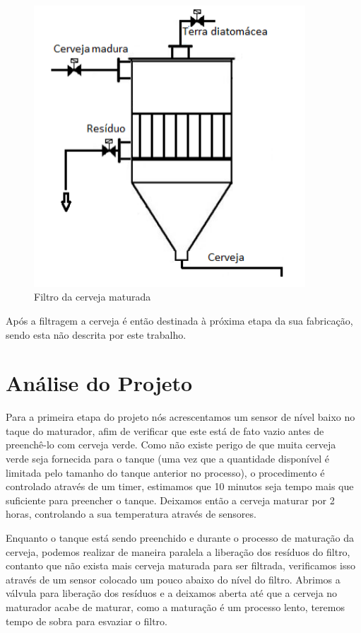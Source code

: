 \documentclass[12pt]{article}
\begin{document}
	\begin{figure}[H]
		\centering
		\includegraphics [width=4in]{filtro.png}
		\caption {Filtro da cerveja maturada}
		\label{fig:filtro}
	\end{figure}
	
	Após a filtragem a cerveja é então destinada à próxima etapa da sua fabricação, sendo esta não descrita por este trabalho.
	
	\section {Análise do Projeto}
	Para a primeira etapa do projeto nós acrescentamos um sensor de nível baixo no taque do maturador, afim de verificar que este está de fato vazio antes de preenchê-lo com cerveja verde. Como não existe perigo de que muita cerveja verde seja fornecida para o tanque (uma vez que a quantidade disponível é limitada pelo tamanho do tanque anterior no processo), o procedimento é controlado através de um timer, estimamos que 10 minutos seja tempo mais que suficiente para preencher o tanque. Deixamos então a cerveja maturar por 2 horas, controlando a sua temperatura através de sensores.
	
	Enquanto o  tanque está sendo preenchido e durante o processo de maturação da cerveja, podemos realizar de maneira paralela a liberação dos resíduos do filtro, contanto que não exista mais cerveja maturada para ser filtrada, verificamos isso através de um sensor colocado um pouco abaixo do nível do filtro. Abrimos a válvula para liberação dos resíduos e a deixamos aberta até que a cerveja no maturador acabe de maturar, como a maturação é um processo lento, teremos tempo de sobra para esvaziar o filtro.
	
\end{document}
